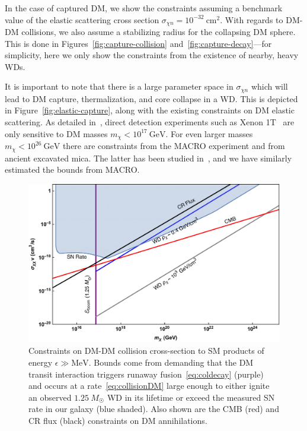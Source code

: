 \documentclass[preprintnumbers,amsmath,amssymb,prd,superscriptaddress]{revtex4}
\newcommand{\GeV}{\text{GeV}}
\newcommand{\MeV}{\text{MeV}}
\newcommand{\cm}{\text{cm}}
\begin{document}
In the case of captured DM, we show the constraints assuming a benchmark value of the elastic scattering cross section $\sigma_{\chi n} = 10^{-32} ~\cm^2$.
With regards to DM-DM collisions, we also assume a stabilizing radius for the collapsing DM sphere. 
This is done in Figures~\ref{fig:capture-collision} and~\ref{fig:capture-decay}---for simplicity, here we only show the constraints from the existence of nearby, heavy WDs.

It is important to note that there is a large parameter space in $\sigma_{\chi n}$ which will lead to DM capture, thermalization, and core collapse in a WD. 
This is depicted in Figure~\ref{fig:elastic-capture}, along with the existing constraints on DM elastic scattering. 
As detailed in~\cite{Mack:2007xj}, direct detection experiments such as Xenon 1T~\cite{Aprile:2017iyp} are only sensitive to DM masses $m_\chi < 10^{17} ~\GeV$. 
For even larger masses $m_\chi < 10^{26} ~\GeV$ there are constraints from the MACRO experiment \cite{Ambrosio:2002qq} and from ancient excavated mica.
The latter has been studied in~\cite{Jacobs:2014yca}, and we have similarly estimated the bounds from MACRO. 

\begin{figure}
\includegraphics[scale=.45]{collisionobservation.pdf}
\caption{Constraints on DM-DM collision cross-section to SM products of energy $\epsilon \gg \MeV$.
Bounds come from demanding that the DM transit interaction triggers runaway fusion~\eqref{eq:coldecay} (purple) and occurs at a rate~\eqref{eq:collisionDM} large enough to either ignite an observed $1.25~M_{\astrosun}$ WD in its lifetime or exceed the measured SN rate in our galaxy (blue shaded).
Also shown are the CMB \cite{Slatyer:2009yq} (red) and CR flux (black) constraints on DM annihilations.}
\label{fig:transit-collision}
\end{figure}
\end{document}
